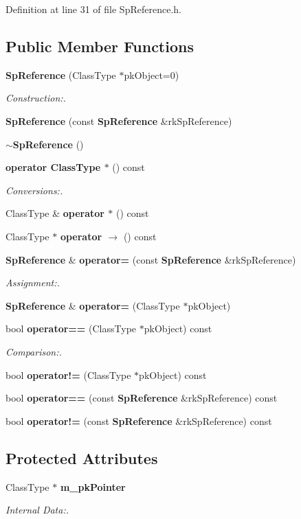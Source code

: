 Definition at line 31 of file Sp\-Reference.h.\subsection*{Public Member Functions}
\begin{CompactItemize}
\item 
{\bf Sp\-Reference} (Class\-Type $\ast$pk\-Object=0)
\begin{CompactList}\small\item\em Construction:. \item\end{CompactList}\item 
{\bf Sp\-Reference} (const {\bf Sp\-Reference} \&rk\-Sp\-Reference)
\item 
{\bf $\sim$Sp\-Reference} ()
\item 
{\bf operator Class\-Type $\ast$} () const
\begin{CompactList}\small\item\em Conversions:. \item\end{CompactList}\item 
Class\-Type \& {\bf operator $\ast$} () const
\item 
Class\-Type $\ast$ {\bf operator $\rightarrow$ } () const
\item 
{\bf Sp\-Reference} \& {\bf operator=} (const {\bf Sp\-Reference} \&rk\-Sp\-Reference)
\begin{CompactList}\small\item\em Assignment:. \item\end{CompactList}\item 
{\bf Sp\-Reference} \& {\bf operator=} (Class\-Type $\ast$pk\-Object)
\item 
bool {\bf operator==} (Class\-Type $\ast$pk\-Object) const
\begin{CompactList}\small\item\em Comparison:. \item\end{CompactList}\item 
bool {\bf operator!=} (Class\-Type $\ast$pk\-Object) const
\item 
bool {\bf operator==} (const {\bf Sp\-Reference} \&rk\-Sp\-Reference) const
\item 
bool {\bf operator!=} (const {\bf Sp\-Reference} \&rk\-Sp\-Reference) const
\end{CompactItemize}
\subsection*{Protected Attributes}
\begin{CompactItemize}
\item 
Class\-Type $\ast$ {\bf m\_\-pk\-Pointer}
\begin{CompactList}\small\item\em Internal Data:. \item\end{CompactList}\end{CompactItemize}


